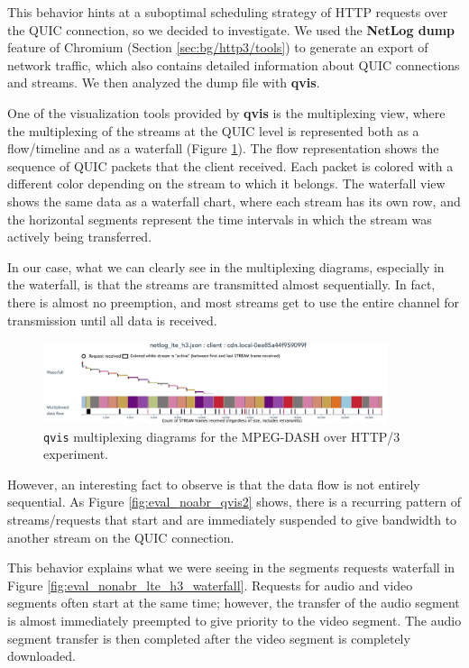 This behavior hints at a suboptimal scheduling strategy of HTTP requests over the QUIC connection, so we decided to investigate. We used the \textbf{NetLog dump} feature of Chromium (Section \ref{sec:bg/http3/tools}) to generate an export of network traffic, which also contains detailed information about QUIC connections and streams. We then analyzed the dump file with \textbf{qvis}.

One of the visualization tools provided by \textbf{qvis} is the multiplexing view, where the multiplexing of the streams at the QUIC level is represented both as a flow/timeline and as a waterfall (Figure \ref{fig:eval_noabr_qvis1}). The flow representation shows the sequence of QUIC packets that the client received. Each packet is colored with a different color depending on the stream to which it belongs. The waterfall view shows the same data as a waterfall chart, where each stream has its own row, and the horizontal segments represent the time intervals in which the stream was actively being transferred.

In our case, what we can clearly see in the multiplexing diagrams, especially in the waterfall, is that the streams are transmitted almost sequentially. In fact, there is almost no preemption, and most streams get to use the entire channel for transmission until all data is received.

\begin{figure}[h]
    \centering
    \includegraphics[width=0.9\textwidth]{res/eval_nonabr_qvis1.png}
    \caption{\texttt{qvis} multiplexing diagrams for the MPEG-DASH over HTTP/3 experiment.}
    \label{fig:eval_noabr_qvis1}
\end{figure}

However, an interesting fact to observe is that the data flow is not entirely sequential. As Figure \ref{fig:eval_noabr_qvis2} shows, there is a recurring pattern of streams/requests that start and are immediately suspended to give bandwidth to another stream on the QUIC connection.

This behavior explains what we were seeing in the segments requests waterfall in Figure \ref{fig:eval_nonabr_lte_h3_waterfall}. Requests for audio and video segments often start at the same time; however, the transfer of the audio segment is almost immediately preempted to give priority to the video segment. The audio segment transfer is then completed after the video segment is completely downloaded.

